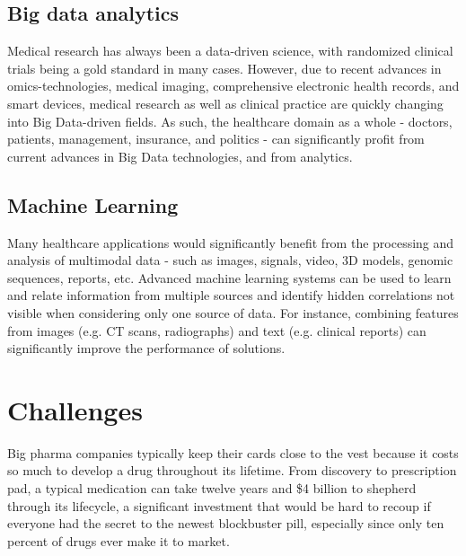 \documentclass[sigconf]{acmart}
\begin{document}
\subsection{Big data analytics}
Medical research has always been a data-driven science, with 
randomized clinical trials being a gold standard in many cases. 
However, due to recent advances in omics-technologies, medical 
imaging, comprehensive electronic health records, and smart devices,
medical research as well as clinical practice are quickly changing 
into Big Data-driven fields. As such, the healthcare domain as a 
whole - doctors, patients, management, insurance, and politics -
can significantly profit from current advances in Big Data 
technologies, and from analytics. \cite{TR04}
\subsection{Machine Learning}
Many healthcare applications would significantly benefit from the
processing and analysis of multimodal data - such as images, 
signals, video, 3D models, genomic sequences, reports, etc. 
Advanced machine learning systems can be used to learn and relate
information from multiple sources and identify hidden correlations 
not visible when considering only one source of data. For instance,
combining features from images (e.g. CT scans, radiographs) and text
(e.g. clinical reports) can significantly improve the performance 
of solutions. \cite{TR04}

\section{Challenges}
Big pharma companies typically keep their cards close to the vest 
because it costs so much to develop a drug throughout its lifetime.
From discovery to prescription pad, a typical medication can take 
twelve years and \$4 billion to shepherd through its lifecycle, a
significant investment that would be hard to recoup if everyone had
the secret to the newest blockbuster pill, especially since only ten
percent of drugs ever make it to market. \cite{AR06}
\end{document}
